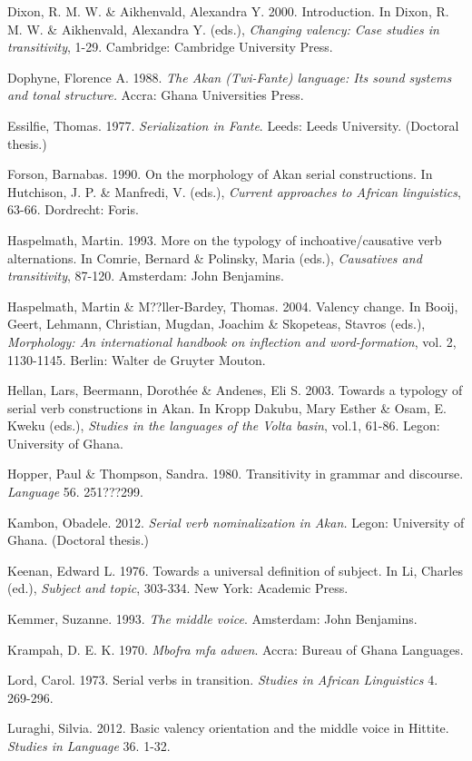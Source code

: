 \documentclass[output=paper]{langsci/langscibook}
\begin{document}
Dixon, R. M. W. \& Aikhenvald, Alexandra Y. 2000. Introduction. In Dixon, R. M. W. \& Aikhenvald, Alexandra Y. (eds.), \textit{Changing valency: Case studies in transitivity}, 1-29. Cambridge: Cambridge University Press.

Dophyne, Florence A. 1988. \textit{The Akan (Twi-Fante) language: Its sound systems and tonal structure.} Accra: Ghana Universities Press.

Essilfie, Thomas. 1977. \textit{Serialization in Fante}. Leeds: Leeds University. (Doctoral thesis.)

Forson, Barnabas. 1990. On the morphology of Akan serial constructions. In Hutchison, J. P. \& Manfredi, V. (eds.), \textit{Current approaches to African linguistics}, 63-66. Dordrecht: Foris.

Haspelmath, Martin. 1993. More on the typology of inchoative/causative verb alternations. In Comrie, Bernard \& Polinsky, Maria (eds.), \textit{Causatives and transitivity}, 87-120. Amsterdam: John Benjamins.

Haspelmath, Martin \& M??ller-Bardey, Thomas. 2004. Valency change. In Booij, Geert, Lehmann, Christian, Mugdan, Joachim \& Skopeteas, Stavros (eds.), \textit{Morphology: An international handbook on inflection and word-formation}, vol. 2, 1130-1145. Berlin: Walter de Gruyter Mouton.

Hellan, Lars, Beermann, Dorothée \& Andenes, Eli S. 2003. Towards a typology of serial verb constructions in Akan. In Kropp Dakubu, Mary Esther \& Osam, E. Kweku (eds.), \textit{Studies in the languages of the Volta basin}, vol.1, 61-86. Legon: University of Ghana.

Hopper, Paul \& Thompson, Sandra. 1980. Transitivity in grammar and discourse. \textit{Language} 56. 251???299.

Kambon, Obadele. 2012. \textit{Serial verb nominalization in Akan.} Legon: University of Ghana. (Doctoral thesis.)

Keenan, Edward L. 1976. Towards a universal definition of subject. In Li, Charles (ed.), \textit{Subject and topic}, 303-334. New York: Academic Press.

Kemmer, Suzanne. 1993. \textit{The middle voice}. Amsterdam: John Benjamins.

Krampah, D. E. K. 1970. \emph{Mbofra mfa adwen}. Accra: Bureau of Ghana Languages.

Lord, Carol. 1973. Serial verbs in transition. \textit{Studies in African Linguistics} 4. 269-296.

Luraghi, Silvia. 2012. Basic valency orientation and the middle voice in Hittite. \textit{Studies in Language} 36. 1-32.
\end{document}
